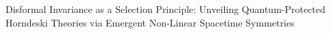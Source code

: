 \documentclass[twocolumn]{aastex631}
\begin{document}
Disformal Invariance as a Selection Principle: Unveiling Quantum-Protected Horndeski Theories via Emergent Non-Linear Spacetime Symmetries
\end{document}

